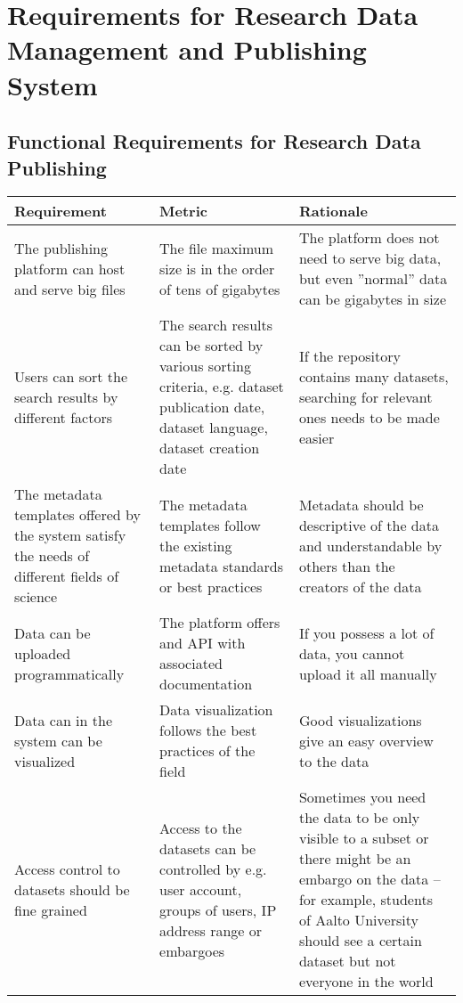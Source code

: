 \chapter[Design Requirements]{Requirements for Research Data Management and Publishing System}
\label{chapter:reqs}

\section[Research Data Publishing]{Functional Requirements for Research Data Publishing}

\tabcolsep=0.11cm
\begin{tabularx}{\textwidth}{| >{\raggedright}p{3cm} | >{\raggedright}p{3cm} | X |}
    \hline
    \textbf{Requirement} & \textbf{Metric}& \textbf{Rationale} \\
    \hline
    \rowcolor{Gray}
    The publishing platform can host and serve big files    &The file maximum size is in the order of tens of gigabytes & The platform does not need to serve big data, but even ''normal'' data can be gigabytes in size\\
    \hline
    Users can sort the search results by different factors &The search results can be sorted by various sorting criteria, e.g. dataset publication date, dataset language, dataset creation date & If the repository contains many datasets, searching for relevant ones needs to be made easier\\
    \hline
    \rowcolor{Gray}
    The metadata templates offered by the system satisfy the needs of different fields of science    &The metadata templates follow the existing metadata standards or best practices & Metadata should be descriptive of the data and understandable by others than the creators of the data\\
    \hline
    Data can be uploaded programmatically  &The platform offers and API with associated documentation  & If you possess a lot of data, you cannot upload it all manually\\
    \hline
    \rowcolor{Gray}
    Data can in the system can be visualized        &Data visualization follows the best practices of the field  & Good visualizations give an easy overview to the data\\
    \hline
    Access control to datasets should be fine grained  & Access to the datasets can be controlled by e.g. user account, groups of users, IP address range or embargoes & Sometimes you need the data to be only visible to a subset or there might be an embargo on the data – for example, students of Aalto University should see a certain dataset but not everyone in the world\\

\end{tabularx}
